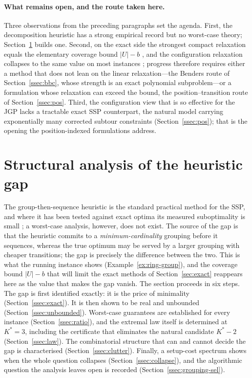\documentclass[11pt,a4paper]{article}
\theoremstyle{plain}
\theoremstyle{definition}
\theoremstyle{remark}
\newcommand{\U}{U}
\newcommand{\Kst}{K^{\ast}}
\begin{document}
\paragraph{What remains open, and the route taken here.}
Three observations from the preceding paragraphs set the agenda. First, the
decomposition heuristic has a strong empirical record but no worst-case theory;
Section~\ref{sec:gap} builds one. Second, on the exact side the strongest compact
relaxation equals the elementary coverage bound $\lvert\U\rvert-b$
\citep{daSilva2024}, and the configuration relaxation collapses to the same value on
most instances \citep{Moreira2026}; progress therefore requires either a method that
does not lean on the linear relaxation---the Benders route of Section~\ref{ssec:bbc},
whose strength is an exact polynomial subproblem---or a formulation whose relaxation
can exceed the bound, the position--transition route of Section~\ref{ssec:pos}.
Third, the configuration view that is so effective for the JGP \citep{Otiai2026}
lacks a tractable exact SSP counterpart, the natural model carrying exponentially
many corrected subtour constraints (Section~\ref{ssec:pos}); that is the opening the
position-indexed formulations address.

\section{Structural analysis of the heuristic gap}\label{sec:gap}
The group-then-sequence heuristic is the standard practical method for the SSP, and
where it has been tested against exact optima its measured suboptimality is small
\citep{Burger2015}; a worst-case analysis, however, does not exist. The source of the
gap is that the heuristic
commits to a \emph{minimum-cardinality} grouping before it sequences, whereas the true
optimum may be served by a larger grouping with cheaper transitions; the gap is
precisely the difference between the two. This is what the running instance shows
(Example~\ref{ex:ring-group}), and the coverage bound $\lvert\U\rvert-b$ that will limit
the exact methods of Section~\ref{sec:exact} reappears here as the value that makes the
gap vanish. The section proceeds in six steps. The gap is first identified
exactly: it is the price of minimality (Section~\ref{ssec:exact}). It is then
shown to be real and unbounded (Section~\ref{ssec:unbounded}). Worst-case
guarantees are established for every instance (Section~\ref{ssec:ratio}), and the
extremal law itself is determined at $\Kst=3$, including the certificate that
eliminates the natural candidate $\Kst-2$ (Section~\ref{ssec:law}). The
combinatorial structure that can and cannot decide the gap is characterised
(Section~\ref{ssec:clutter}). Finally, a setup-cost spectrum shows when the whole
question collapses (Section~\ref{ssec:collapse}), and the algorithmic question
the analysis leaves open is recorded (Section~\ref{ssec:grouping-sel}).
\end{document}
